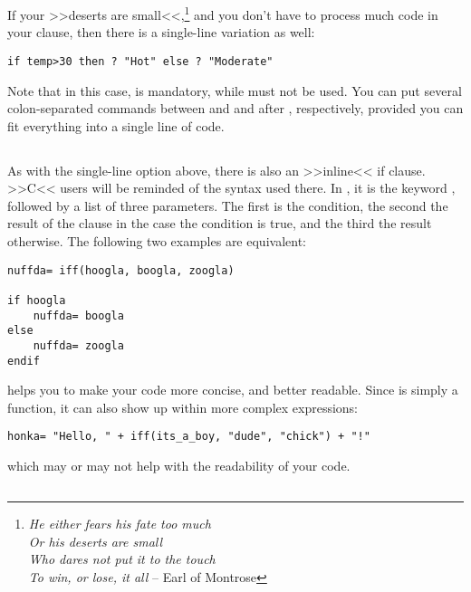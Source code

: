 If your >>deserts are small<<,\footnote{\emph{He either fears his fate
too much\\ Or his deserts are small\\ Who dares not put it to the
touch\\ To win, or lose, it all} -- Earl of Montrose} and you don't have
to process much code in your  clause, then there is a single-line
variation as well:

\begin{lstlisting}
if temp>30 then ? "Hot" else ? "Moderate"
\end{lstlisting}

Note that in this case,  is mandatory, while  must
not be used. You can put several colon-separated commands between
 and  and after , respectively, provided you
can fit everything into a single line of code.

\subsection{}

As with the single-line option above, there is also an >>inline<< if
clause. >>C<< users will be reminded of the  syntax used
there. In \SB, it is the keyword , followed by a list of three
parameters. The first is the condition, the second the result of the
clause in the case the condition is true, and the third the result
otherwise. The following two examples are equivalent:

\begin{lstlisting}
nuffda= iff(hoogla, boogla, zoogla)

if hoogla
	nuffda= boogla
else
	nuffda= zoogla
endif
\end{lstlisting}

 helps you to make your code more concise, and better readable.
Since  is simply a function, it can also show up within more
complex expressions:

\begin{lstlisting}
honka= "Hello, " + iff(its_a_boy, "dude", "chick") + "!"
\end{lstlisting}

which may or may not help with the readability of your code.

\subsection{}

